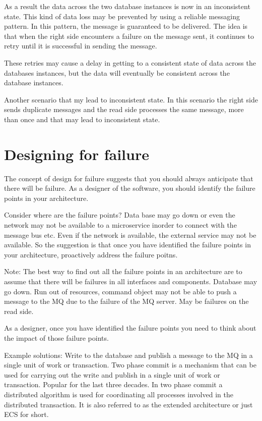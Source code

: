 \documentclass[a4paper, 11pt]{book}
\begin{document}
    As a result the data across the two database instances is now in an inconsistent state.
    This kind of data loss may be prevented by using a reliable messaging pattern.
    In this pattern, the message is guaranteed to be delivered.
    The idea is that when the right side encounters a failure on the message sent, it continues to retry until it is successful in sending the message.

    These retries may cause a delay in getting to a consistent state of data across the databases instances, but the data will eventually be consistent across the database instances.

    Another scenario that my lead to inconsistent state.
    In this scenario the right side sends duplicate messages and the read side processes the same message, more than once and that may lead to inconsistent state.


    \section{Designing for failure}
    The concept of design for failure suggests that you should always anticipate that there will be failure.
    As a designer of the software, you should identify the failure points in your architecture.

    Consider where are the failure points?
    Data base may go down or even the network may not be available to a microservice inorder to connect with the message bus etc.
    Even if the network is available, the external service may not be available.
    So the suggestion is that once you have identified the failure points in your architecture, proactively address the failure poitns.

    Note:
    The best way to find out all the failure points in an architecture are to assume that there will be failures in all interfaces and components.
    Database may go down. Run out of resources, command object may not be able to push a message to the MQ due to the failure of the MQ server.
    May be failures on the read side.

    As a designer, once you have identified the failure points you need to think about the impact of those failure points.

    Example solutions:
    Write to the database and publish a message to the MQ in a single unit of work or transaction.
    Two phase commit is a mechanism that can be used for carrying out the write and publish in a single unit of work or transaction.
    Popular for the last three decades.
    In two phase commit a distributed algorithm is used for coordinating all processes involved in the distributed transaction.
    It is also referred to as the extended architecture or just ECS for short.
\end{document}

